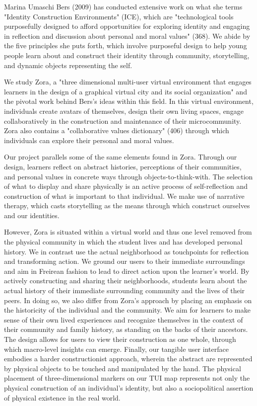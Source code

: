 \documentclass{sigchi-ext}
\begin{document}
Marina Umaschi Bers (2009) has conducted extensive work on what she terms "Identity Construction Environments" (ICE), which are "technological tools purposefully designed to afford opportunities for exploring identity and engaging in reflection and discussion about personal and moral values" (368). We abide by the five principles she puts forth, which involve purposeful design to help young people learn about and construct their identity through community, storytelling, and dynamic objects representing the self.

We study Zora, a "three dimensional multi-user virtual environment that engages learners in the design of a graphical virtual city and its social organization" and the pivotal work behind Bers's ideas within this field. In this virtual environment, individuals create avatars of themselves, design their own living spaces, engage collaboratively in the construction and maintenance of their microcommunity. Zora also contains a "collaborative values dictionary" (406) through which individuals can explore their personal and moral values. 

Our project parallels some of the same elements found in Zora. Through our design, learners reflect on abstract histories, perceptions of their communities, and personal values in concrete ways through objects-to-think-with. The selection of what to display and share physically is an active process of self-reflection and construction of what is important to that individual. We make use of narrative therapy, which casts storytelling as the means through which construct ourselves and our identities.

However, Zora is situated within a virtual world and thus one level removed from the physical community in which the student lives and has developed personal history. We in contrast use the actual neighborhood as touchpoints for reflection and transforming action. We ground our users to their immediate surroundings and aim in Freirean fashion to lead to direct action upon the learner's world. By actively constructing and sharing their neighborhoods, students learn about the actual history of their immediate surrounding community and the lives of their peers. In doing so, we also differ from Zora's approach by placing an emphasis on the historicity of the individual and the community. We aim for learners to make sense of their own lived experiences and recognize themselves in the context of their community and family history, as standing on the backs of their ancestors. The design allows for users to view their construction as one whole, through which macro-level insights can emerge. Finally, our tangible user interface embodies a harder constructionist approach, wherein the abstract are represented by physical objects to be touched and manipulated by the hand. The physical placement of three-dimensional markers on our TUI map represents not only the physical construction of an individual's identity, but also a sociopolitical assertion of physical existence in the real world. 
\end{document}
